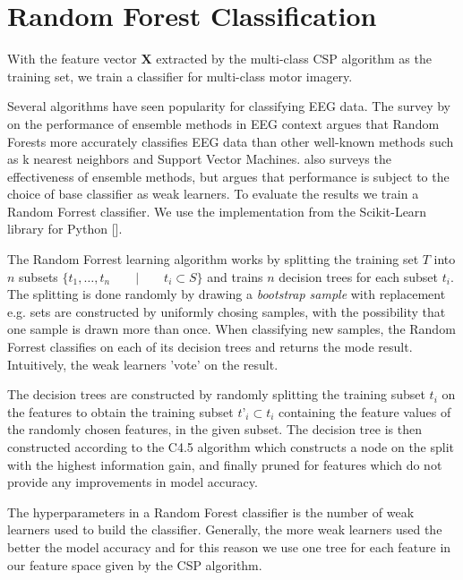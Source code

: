 \section{Random Forest Classification}

With the feature vector $\mathbf{X}$ extracted by the multi-class CSP algorithm as the training set, we train a classifier for multi-class motor imagery.

Several algorithms have seen popularity for classifying EEG data. The survey by \citet{chan2015systematic} on the performance of ensemble methods in EEG context argues that Random Forests more accurately classifies EEG data than other well-known methods such as k nearest neighbors and Support Vector Machines. \citet{sun2007experimental} also surveys the effectiveness of ensemble methods, but argues that performance is subject to the choice of base classifier as weak learners. To evaluate the results we train a Random Forrest classifier. We use the implementation from the Scikit-Learn library for Python [\citet{scikit-learn}].   

The Random Forrest learning algorithm works by splitting the training set $T$ into $n$ subsets $\{t_1,…,t_n \qquad | \qquad t_i \subset S\}$ and trains $n$ decision trees for each subset $t_i$. The splitting is done randomly by drawing a \emph{bootstrap sample} with replacement e.g. sets are constructed by uniformly chosing samples, with the possibility that one sample is drawn more than once. When classifying new samples, the Random Forrest classifies on each of its decision trees and returns the mode result. Intuitively, the weak learners 'vote' on the result.

The decision trees are constructed by randomly splitting the training subset $t_i$ on the features to obtain the training subset $t’_i \subset t_i$ containing the feature values of the randomly chosen features, in the given subset. The decision tree is then constructed according to the C4.5 algorithm which constructs a node on the split with the highest information gain, and finally pruned for features which do not provide any improvements in model accuracy.

The hyperparameters in a Random Forest classifier is the number of weak learners used to build the classifier. Generally, the more weak learners used the better the model accuracy and for this reason we use one tree for each feature in our feature space given by the CSP algorithm. 